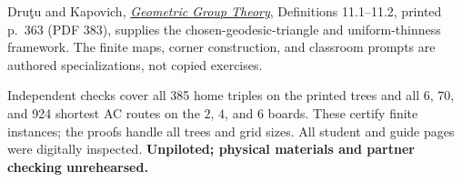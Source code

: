 \documentclass[11pt,letterpaper]{article}
\newcommand{\heading}[1]{\par\vspace{5pt}{\large\bfseries #1}\par}
\begin{document}
\heading{Sources and checking limits}
Dru\c{t}u and Kapovich, \href{https://www.math.ucdavis.edu/~kapovich/EPR/ggt.pdf}{\emph{Geometric Group Theory}}, Definitions 11.1--11.2, printed p.\ 363 (PDF 383), supplies the chosen-geodesic-triangle and uniform-thinness framework. The finite maps, corner construction, and classroom prompts are authored specializations, not copied exercises.

Independent checks cover all 385 home triples on the printed trees and all 6, 70, and 924 shortest AC routes on the $2$, $4$, and $6$ boards. These certify finite instances; the proofs handle all trees and grid sizes. All student and guide pages were digitally inspected. \textbf{Unpiloted; physical materials and partner checking unrehearsed.}
\end{document}
